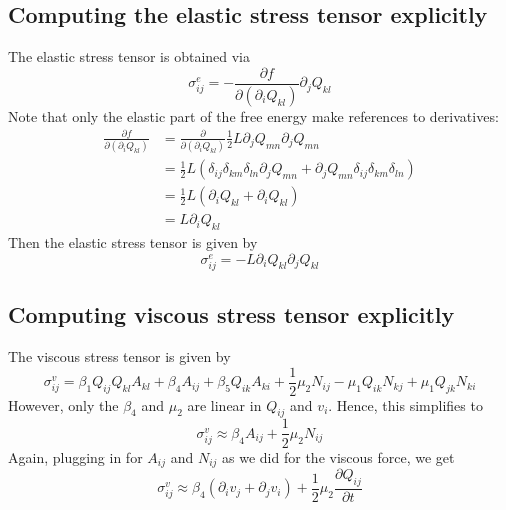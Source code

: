 \documentclass[reqno]{article}
\begin{document}
	\subsection{Computing the elastic stress tensor explicitly}
	The elastic stress tensor is obtained via
	\begin{equation}
		\sigma^{e}_{ij} = -\frac{\partial f}{\partial (\partial_i Q_{kl})} \partial_j Q_{kl}
	\end{equation}
	Note that only the elastic part of the free energy make references to derivatives:
	\begin{equation}
	\begin{split}
		\frac{\partial f}{\partial (\partial_i Q_{kl})} &= \frac{\partial}{\partial (\partial_i Q_{kl})} \frac{1}{2} L \partial_j Q_{mn} \partial_j Q_{mn} \\
		&= \frac{1}{2} L (\delta_{ij}\delta_{km}\delta_{ln} \partial_j Q_{mn} + \partial_j Q_{mn} \delta_{ij}\delta_{km}\delta_{ln}) \\
		&= \frac{1}{2} L (\partial_i Q_{kl} + \partial_i Q_{kl}) \\
		&= L\partial_i Q_{kl}
	\end{split}
	\end{equation}
	Then the elastic stress tensor is given by
	\begin{equation}\label{eq:elastic-stress}
		\sigma^e_{ij} = -L\partial_i Q_{kl} \partial_j Q_{kl}
	\end{equation}
	
	\subsection{Computing viscous stress tensor explicitly}
	The viscous stress tensor is given by
	\begin{equation}
		\sigma^v_{ij} = \beta_1 Q_{ij}Q_{kl}A_{kl} + \beta_4 A_{ij} + \beta_5 Q_{ik} A_{ki} + \frac{1}{2} \mu_2 N_{ij} - \mu_1 Q_{ik}N_{kj} + \mu_1 Q_{jk}N_{ki}
	\end{equation}
	However, only the $\beta_4$ and $\mu_2$ are linear in $Q_{ij}$ and $v_i$. Hence, this simplifies to
	\begin{equation}
		\sigma^v_{ij} \approx \beta_4 A_{ij} + \frac{1}{2} \mu_2 N_{ij}
	\end{equation}
	Again, plugging in for $A_{ij}$ and $N_{ij}$ as we did for the viscous force, we get
	\begin{equation}\label{eq:visc-stress}
		\sigma^v_{ij} \approx \beta_4 (\partial_i v_j + \partial_j v_i) + \frac{1}{2} \mu_2  \frac{\partial Q_{ij}}{\partial t}
	\end{equation}
	
\end{document}
